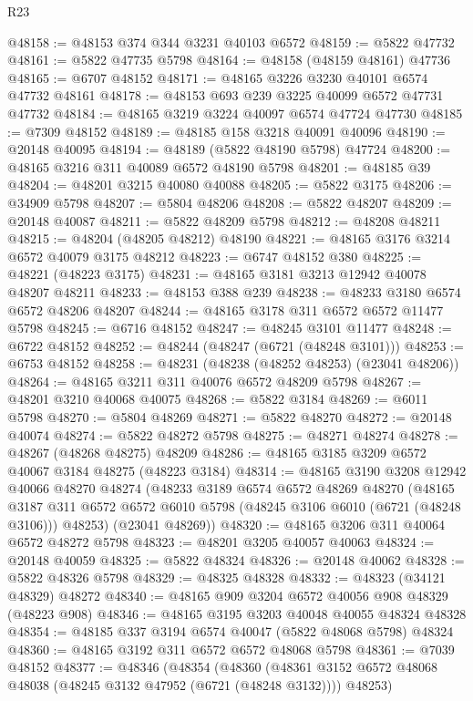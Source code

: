 \begin{lexlean}{R23}
\begin{coremodule}
@48158 := @48153 @374 @344 @3231 @40103 @6572
@48159 := @5822 @47732
@48161 := @5822 @47735 @5798
@48164 := @48158 (@48159 @48161) @47736
@48165 := @6707 @48152
@48171 := @48165 @3226 @3230 @40101 @6574 @47732 @48161
@48178 := @48153 @693 @239 @3225 @40099 @6572 @47731 @47732
@48184 := @48165 @3219 @3224 @40097 @6574 @47724 @47730
@48185 := @7309 @48152
@48189 := @48185 @158 @3218 @40091 @40096
@48190 := @20148 @40095
@48194 := @48189 (@5822 @48190 @5798) @47724
@48200 := @48165 @3216 @311 @40089 @6572 @48190 @5798
@48201 := @48185 @39
@48204 := @48201 @3215 @40080 @40088
@48205 := @5822 @3175
@48206 := @34909 @5798
@48207 := @5804 @48206
@48208 := @5822 @48207
@48209 := @20148 @40087
@48211 := @5822 @48209 @5798
@48212 := @48208 @48211
@48215 := @48204 (@48205 @48212) @48190
@48221 := @48165 @3176 @3214 @6572 @40079 @3175 @48212
@48223 := @6747 @48152 @380
@48225 := @48221 (@48223 @3175)
@48231 := @48165 @3181 @3213 @12942 @40078 @48207 @48211
@48233 := @48153 @388 @239
@48238 := @48233 @3180 @6574 @6572 @48206 @48207
@48244 := @48165 @3178 @311 @6572 @6572 @11477 @5798
@48245 := @6716 @48152
@48247 := @48245 @3101 @11477
@48248 := @6722 @48152
@48252 := @48244 (@48247 (@6721 (@48248 @3101)))
@48253 := @6753 @48152
@48258 := @48231 (@48238 (@48252 @48253) (@23041 @48206))
@48264 := @48165 @3211 @311 @40076 @6572 @48209 @5798
@48267 := @48201 @3210 @40068 @40075
@48268 := @5822 @3184
@48269 := @6011 @5798
@48270 := @5804 @48269
@48271 := @5822 @48270
@48272 := @20148 @40074
@48274 := @5822 @48272 @5798
@48275 := @48271 @48274
@48278 := @48267 (@48268 @48275) @48209
@48286 := @48165 @3185 @3209 @6572 @40067 @3184 @48275 (@48223 @3184)
@48314 := @48165
    @3190
    @3208
    @12942
    @40066
    @48270
    @48274
    (@48233
      @3189
      @6574
      @6572
      @48269
      @48270
      (@48165 @3187 @311 @6572 @6572 @6010 @5798 (@48245 @3106 @6010 (@6721 (@48248 @3106))) @48253)
      (@23041 @48269))
@48320 := @48165 @3206 @311 @40064 @6572 @48272 @5798
@48323 := @48201 @3205 @40057 @40063
@48324 := @20148 @40059
@48325 := @5822 @48324
@48326 := @20148 @40062
@48328 := @5822 @48326 @5798
@48329 := @48325 @48328
@48332 := @48323 (@34121 @48329) @48272
@48340 := @48165 @909 @3204 @6572 @40056 @908 @48329 (@48223 @908)
@48346 := @48165 @3195 @3203 @40048 @40055 @48324 @48328
@48354 := @48185 @337 @3194 @6574 @40047 (@5822 @48068 @5798) @48324
@48360 := @48165 @3192 @311 @6572 @6572 @48068 @5798
@48361 := @7039 @48152
@48377 := @48346
    (@48354
      (@48360
        (@48361 @3152 @6572 @48068 @48038 (@48245 @3132 @47952 (@6721 (@48248 @3132))))
        @48253)

\end{coremodule}
\end{lexlean}
